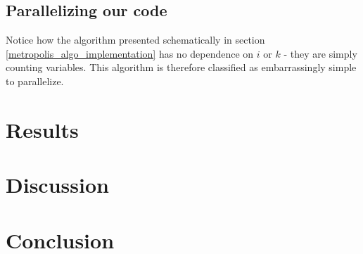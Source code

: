 \documentclass[a4paper, 10pt]{article}
\begin{document}
\subsection{Parallelizing our code}
Notice how the algorithm presented schematically in section \ref{metropolis_algo_implementation} has no dependence on $i$ or $k$ - they are simply counting variables. This algorithm is therefore classified as embarrassingly simple to parallelize.

\section{Results}
\section{Discussion}
\section{Conclusion}
\end{document}
